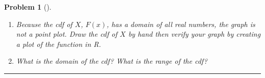 \documentclass[letterpaper,oneside]{book}%
\theoremstyle{plain}
\theoremstyle{box}
\theoremstyle{problem}
\newtheorem{problemnum}{Problem}[chapter]
\newenvironment{problem}[1][]{\begin{problemnum}[#1]}{\end{problemnum}\nopagebreak\hrule\bigskip}
\begin{document}
\begin{problem}
\begin{enumerate}
\begin{itemize}
  \end{itemize}
  We can summarize the information above into a single piecewise defined function, such as
    $$F(x) = 
    \begin{cases}
    0 & x<1 \\
    \frac{1}{6} &1\leq x<2 \\
    \frac{2}{6} &2\leq x<3 \\
    \frac{3}{6} &3\leq x<4 \\
    \frac{4}{6} &4\leq x<5 \\
    \frac{5}{6} &5\leq x<6 \\
    1 & x \geq 6
    \end{cases}.$$
    We call this function the cumulative distribution function (cdf) of the random variable $X$. 
  \item  Because the cdf of $X$, $F(x)$, has a domain of all real numbers, the graph is not a point plot. Draw the cdf of $X$ by hand then verify your graph by creating a plot of the function in R.
  \item What is the domain of the cdf?  What is the range of the cdf?  
 \end{enumerate}
\end{problem}
\end{document}
